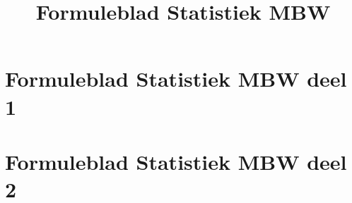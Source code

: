 \documentclass[10pt,a4paper,dutch]{article} %
\title{Formuleblad Statistiek MBW}
\author{}
\date{}
\begin{document}
    \setcounter{page}{3}
    \section*{\LARGE Formuleblad Statistiek MBW deel 1}
    

    \newpage

    \section*{\LARGE Formuleblad Statistiek MBW deel 2}
    
\end{document}
